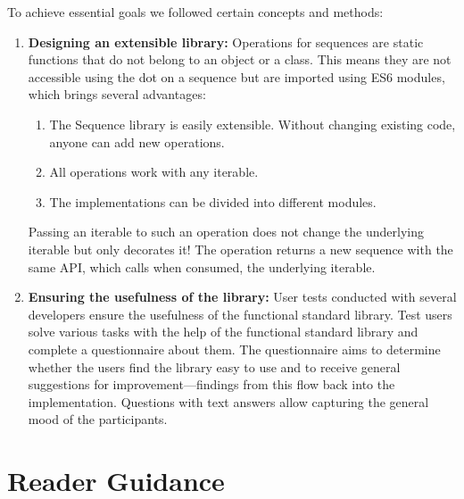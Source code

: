 To achieve essential goals we followed certain concepts and methods:
\begin{enumerate}
  \item \textbf{Designing an extensible library:} Operations for sequences are
    static functions that do not belong to an object or a class. This means
    they are not accessible using the dot on a sequence but are imported using
    ES6 modules, which brings several advantages:
      \begin{enumerate}
        \item The Sequence library is easily extensible. Without changing existing
          code, anyone can add new operations.
        \item All operations work with any iterable.
        \item The implementations can be divided into different modules.
      \end{enumerate}
  Passing an iterable to such an operation does not change the underlying
  iterable but only decorates it! The operation returns a new sequence with the
  same API, which calls when consumed, the underlying iterable.
  \item  \textbf{Ensuring the usefulness of the library:} User tests conducted
    with several developers ensure the usefulness of the functional standard
    library. Test users solve various tasks with the help of the functional
    standard library and complete a questionnaire about them. The questionnaire
    aims to determine whether the users find the library easy to use and to
    receive general suggestions for improvement—findings from this flow back
    into the implementation. Questions with text answers allow capturing the
    general mood of the participants.
\end{enumerate}

\section*{Reader Guidance} %
\label{sec:Reader Guidance}

